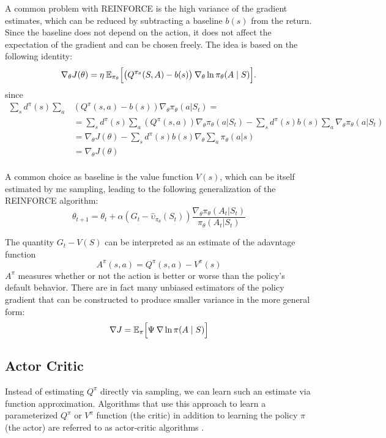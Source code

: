 A common problem with REINFORCE is the high variance of the gradient estimates, which can be reduced by
subtracting a baseline $b(s)$ from the return. Since the baseline does not depend on the action, it does not affect the
expectation of the gradient and can be chosen freely. The idea is based on the following identity: 
$$\nabla_\theta J(\theta) = \eta \: \mathbb{E}_{\pi_\theta} \Bigl[ \big(Q^{\pi_\theta}(S,A) - b(s)\big) \: \nabla_\theta \ln \pi_\theta(A \mid S) \Bigr].$$
since
\begin{align*}
\sum\limits_s d^\pi(s) \sum\limits_a &(Q^\pi(s,a)-b(s)) \nabla_\theta \pi_\theta(a|S_t)= \\
&=\sum_s d^\pi(s) \sum\limits_a (Q^\pi(s,a)) \nabla_\theta \pi_\theta(a|S_t)-\sum\limits_s d^\pi(s) b(s) \sum\limits_a \nabla_\theta \pi_\theta(a|S_t)\\
&=\nabla_\theta J(\theta)-\sum\limits_s d^\pi(s) b(s) \nabla_\theta \sum\limits_a \pi_\theta(a|s)\\
&=\nabla_\theta J(\theta)\\
\end{align*}

A common choice as baseline is the value function \(V(s)\), which can be itself estimated by \gls{mc} sampling, 
leading to the following generalization of the REINFORCE algorithm:
\[
\theta_{t+1}=\theta_t+\alpha(G_t-\hat{\upsilon}_{\pi_\theta}(S_t))
\frac{\nabla_\theta\pi_\theta(A_t|S_t)}{\pi_\theta(A_t|S_t)}
\]

The quantity $G_t-V(S)$ can be interpreted as an estimate of the adavntage function
\begin{equation}
    A^\pi(s,a)=Q^\pi(s,a)-V^\pi(s)
\end{equation}
$A^\pi$ measures whether or not the action is better or worse than the policy's default behavior.
There are in fact many unbiased estimators of the policy gradient that can be constructed to produce 
smaller variance in the more general form: 
$$	\nabla J = \mathbb{E}_{\pi} \Bigl[\Psi \: \nabla \ln \pi(A \mid S) \Bigr]$$

\subsection{Actor Critic}

Instead of estimating $Q^\pi$ directly via sampling, we can learn such an estimate via
function approximation. Algorithms that use this approach to learn a parameterized $Q^\pi$ or $V^\pi$ 
function (the critic) in addition to learning the policy $\pi$ (the actor) are
referred to as actor-critic algorithms \cite{mnih2016asynchronousmethodsdeepreinforcement}. 


